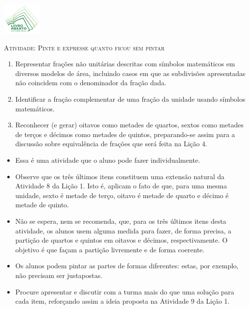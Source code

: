 \documentclass[10 pt,usenames,dvipsnames, oneside]{article}
\begin{document}
\begin{center}
  \begin{minipage}[l]{3cm}
\includegraphics[width=2cm]{logo}    
\end{minipage}\hfill
\begin{minipage}[r]{.8\textwidth}
 {\Large \scshape Atividade: Pinte e expresse quanto ficou sem pintar}  
\end{minipage}
\end{center}
\vspace{.2cm}

\ifdefined\prof
\begin{goals}
\begin{enumerate}

    \item       Representar frações não unitárias descritas com símbolos matemáticos em diversos modelos de área, incluindo casos em que as subdivisões apresentadas não coincidem com o denominador da fração dada.
    \item       Identificar a fração complementar de uma fração da unidade usando símbolos matemáticos.
    \item       Reconhecer (e gerar) oitavos como metades de quartos, sextos como metades de terços e décimos como metades de quintos, preparando-se assim para a discussão sobre equivalência de frações que será feita na Lição 4.

\end{enumerate}
\tcblower

\begin{itemize} %
    \item       Essa é uma atividade que o aluno pode fazer individualmente.
    \item       Observe que os três últimos itens constituem uma extensão natural da Atividade 8 da Lição 1. Isto é, aplicam o fato de que, para uma mesma unidade, sexto é metade de terço, oitavo é metade de quarto e décimo é metade de quinto.
    \item       Não se espera, nem se recomenda, que, para os três últimos itens desta atividade, os alunos usem alguma medida para fazer, de forma precisa, a partição de quartos e quintos em oitavos e décimos, respectivamente. O objetivo é que façam a partição livremente e de forma coerente.
    \item Os alunos podem pintar as partes de formas diferentes: estas, por exemplo, não precisam ser justapostas.
    \item Procure apresentar e discutir com a turma mais do que uma solução para cada item, reforçando assim a ideia proposta na Atividade 9 da Lição 1.
\end{itemize} %

\end{goals}
\end{document}
